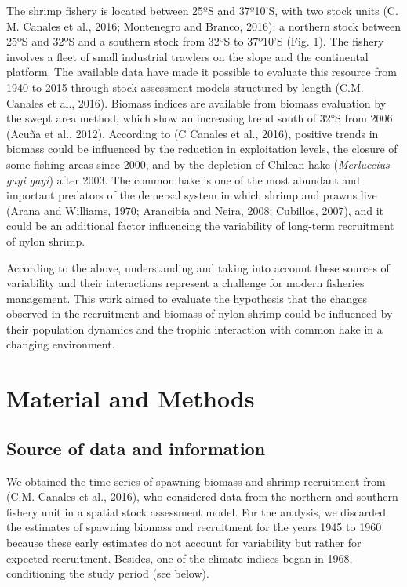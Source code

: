 \documentclass[12pt]{article}
\begin{document}
The shrimp fishery is located between 25ºS and 37º10'S, with two stock
units (C. M. Canales et al., 2016; Montenegro and Branco, 2016): a
northern stock between 25ºS and 32ºS and a southern stock from 32ºS to
37º10'S (Fig. 1). The fishery involves a fleet of small industrial
trawlers on the slope and the continental platform. The available data
have made it possible to evaluate this resource from 1940 to 2015
through stock assessment models structured by length (C.M. Canales et
al., 2016). Biomass indices are available from biomass evaluation by the
swept area method, which show an increasing trend south of 32°S from
2006 (Acuña et al., 2012). According to (C Canales et al., 2016),
positive trends in biomass could be influenced by the reduction in
exploitation levels, the closure of some fishing areas since 2000, and
by the depletion of Chilean hake (\emph{Merluccius gayi gayi}) after
2003. The common hake is one of the most abundant and important
predators of the demersal system in which shrimp and prawns live (Arana
and Williams, 1970; Arancibia and Neira, 2008; Cubillos, 2007), and it
could be an additional factor influencing the variability of long-term
recruitment of nylon shrimp.

According to the above, understanding and taking into account these
sources of variability and their interactions represent a challenge for
modern fisheries management. This work aimed to evaluate the hypothesis
that the changes observed in the recruitment and biomass of nylon shrimp
could be influenced by their population dynamics and the trophic
interaction with common hake in a changing environment. \FloatBarrier

\hypertarget{material-and-methods}{%
\section{Material and Methods}\label{material-and-methods}}

\hypertarget{source-of-data-and-information}{%
\subsection{Source of data and
information}\label{source-of-data-and-information}}

We obtained the time series of spawning biomass and shrimp recruitment
from (C.M. Canales et al., 2016), who considered data from the northern
and southern fishery unit in a spatial stock assessment model. For the
analysis, we discarded the estimates of spawning biomass and recruitment
for the years 1945 to 1960 because these early estimates do not account
for variability but rather for expected recruitment. Besides, one of the
climate indices began in 1968, conditioning the study period (see
below).
\end{document}
